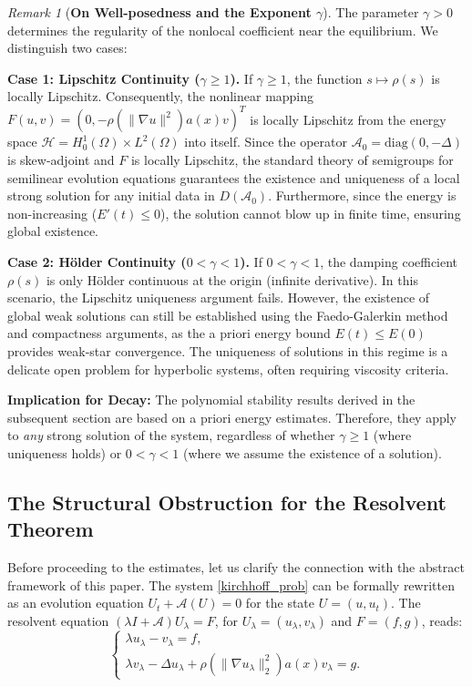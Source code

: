 \documentclass[11pt,reqno]{amsart}
\theoremstyle{remark}
\newtheorem{remark}[theorem]{Remark}
\begin{document}
\begin{remark}[\textbf{On Well-posedness and the Exponent $\gamma$}]
The parameter $\gamma > 0$ determines the regularity of the nonlocal coefficient near the equilibrium. We distinguish two cases:

\textbf{Case 1: Lipschitz Continuity ($\gamma \ge 1$).}
If $\gamma \ge 1$, the function $s \mapsto \rho(s)$ is locally Lipschitz. Consequently, the nonlinear mapping $F(u, v) = (0, -\rho(\|\nabla u\|^2) a(x) v)^T$ is locally Lipschitz from the energy space $\mathcal{H} = H_0^1(\Omega) \times L^2(\Omega)$ into itself. Since the operator $\mathcal{A}_0 = \text{diag}(0, -\Delta)$ is skew-adjoint and $F$ is locally Lipschitz, the standard theory of semigroups for semilinear evolution equations guarantees the existence and uniqueness of a local strong solution for any initial data in $D(\mathcal{A}_0)$. Furthermore, since the energy is non-increasing ($E'(t) \le 0$), the solution cannot blow up in finite time, ensuring global existence.

\textbf{Case 2: Hölder Continuity ($0 < \gamma < 1$).}
If $0 < \gamma < 1$, the damping coefficient $\rho(s)$ is only Hölder continuous at the origin (infinite derivative). In this scenario, the Lipschitz uniqueness argument fails. However, the existence of global weak solutions can still be established using the Faedo-Galerkin method and compactness arguments, as the a priori energy bound $E(t) \le E(0)$ provides weak-star convergence. The uniqueness of solutions in this regime is a delicate open problem for hyperbolic systems, often requiring viscosity criteria.

\textbf{Implication for Decay:} The polynomial stability results derived in the subsequent section are based on a priori energy estimates. Therefore, they apply to \textit{any} strong solution of the system, regardless of whether $\gamma \ge 1$ (where uniqueness holds) or $0 < \gamma < 1$ (where we assume the existence of a solution).
\end{remark}


\subsection{The Structural Obstruction for the Resolvent Theorem}
\label{subsec:kirchhoff_obstruction}

Before proceeding to the estimates, let us clarify the connection with the abstract framework of this paper.
The system \eqref{kirchhoff_prob} can be formally rewritten as an evolution equation $U_t + \mathcal{A}(U) = 0$ for the state $U=(u,u_t)$. The resolvent equation $(\lambda I + \mathcal{A})U_\lambda = F$, for $U_\lambda = (u_\lambda, v_\lambda)$ and $F=(f,g)$, reads:
\[
\begin{cases}
\lambda u_\lambda - v_\lambda = f, \\
\lambda v_\lambda - \Delta u_\lambda + \rho(\|\nabla u_\lambda\|_2^2) a(x) v_\lambda = g.
\end{cases}
\]
\end{document}

